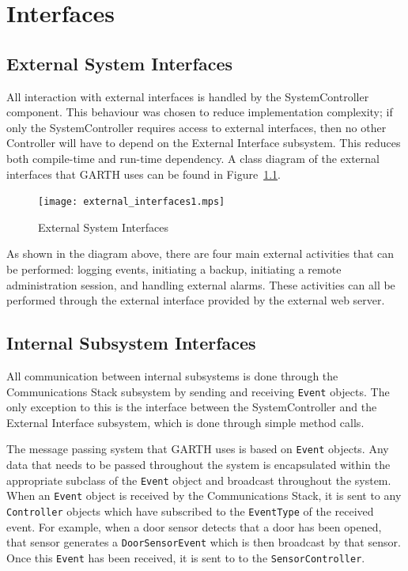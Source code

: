\documentclass{report}
\begin{document}
\chapter{Interfaces} %
\label{ch:interfaces}

\section{External System Interfaces}

All interaction with external interfaces is handled by the
SystemController component. This behaviour was chosen to reduce
implementation complexity; if only the SystemController requires
access to external interfaces, then no other Controller will have to
depend on the External Interface subsystem.  This reduces both
compile-time and run-time dependency. A class diagram of the external
interfaces that GARTH uses can be found in
Figure~\ref{fig:external_interfaces}.

\begin{figure}[hp]
    \centering
        \caption{External System Interfaces}
        \scriptsize
        \setlength{\unitlength}{2.0em}
        \texttt{[image: external\_interfaces1.mps]}
        \normalsize
    \label{fig:external_interfaces}
\end{figure}

As shown in the diagram above, there are four main external activities
that can be performed: logging events, initiating a backup, initiating
a remote administration session, and handling external alarms. These
activities can all be performed through the external interface
provided by the external web server.

\section{Internal Subsystem Interfaces}

All communication between internal subsystems is done through the
Communications Stack subsystem by sending and receiving \texttt{Event}
objects. The only exception to this is the interface between the
SystemController and the External Interface subsystem, which is done
through simple method calls.

The message passing system that GARTH uses is based on \texttt{Event}
objects. Any data that needs to be passed throughout the system is
encapsulated within the appropriate subclass of the \texttt{Event}
object and broadcast throughout the system. When an \texttt{Event}
object is received by the Communications Stack, it is sent to any
\texttt{Controller} objects which have subscribed to the
\texttt{EventType} of the received event. For example, when a door
sensor detects that a door has been opened, that sensor generates a
\texttt{DoorSensorEvent} which is then broadcast by that sensor. Once
this \texttt{Event} has been received, it is sent to to the
\texttt{SensorController}.
\end{document}
